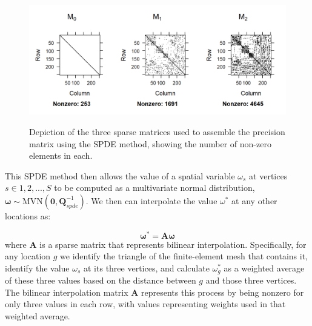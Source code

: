 \begin{figure}[!ht]
    \caption[Sparse matrices generated for SPDE method in bald eagle example]{Depiction of the three sparse matrices used to assemble the precision matrix using the SPDE method, showing the number of non-zero elements in each.}
    \centering
    \includegraphics[width=5.5in]{Chap_5/SPDE_matrices.png}
    \label{fig:Chap5_SPDE_matrices}
\end{figure}

This SPDE method then allows the value of a spatial variable \(\omega_s\) at vertices \(s \in {1,2,...,S} \) to be computed as a multivariate normal distribution, \( \mathbf{\omega} \sim \mathrm{MVN}(\mathbf{0},\mathbf{Q}_{spde}^{-1}) \).  We then can interpolate the value \(\omega^*\) at any other locations as:

\begin{equation}
    \mathbf{\omega}^* = \mathbf{A \omega}
\end{equation}
where \(\mathbf{A}\) is a sparse matrix that represents bilinear interpolation.  Specifically, for any location \(g\) we identify the triangle of the finite-element mesh that contains it, identify the value \(\omega_s\) at its three vertices, and calculate \(\omega_g^*\) as a weighted average of these three values based on the distance between \(g\) and those three vertices.  The bilinear interpolation matrix \(\mathbf{A}\) represents this process by being nonzero for only three values in each row, with values representing weights used in that weighted average. 

\lstset{style=Rcode}


